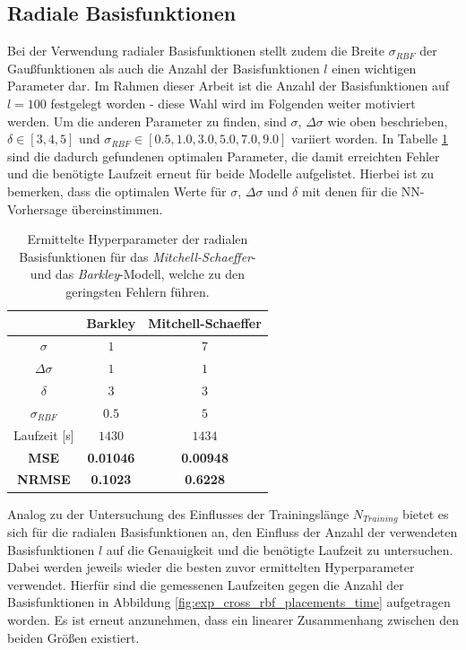 \subsection{Radiale Basisfunktionen}
Bei der Verwendung radialer Basisfunktionen stellt zudem die Breite $\sigma_{RBF}$ der Gaußfunktionen als auch die Anzahl der Basisfunktionen $l$ einen wichtigen Parameter dar. Im Rahmen dieser Arbeit ist die Anzahl der Basisfunktionen auf $l=100$ festgelegt worden - diese Wahl wird im Folgenden weiter motiviert werden. Um die anderen Parameter zu finden, sind $\sigma$, $\Delta \sigma$ wie oben beschrieben, $\delta \in [3,4,5]$ und $\sigma_{RBF} \in [0.5, 1.0, 3.0, 5.0, 7.0, 9.0]$ variiert worden. In Tabelle \ref{tab:exp_cross_rbf_results} sind die dadurch gefundenen optimalen Parameter, die damit erreichten Fehler und die benötigte Laufzeit erneut für beide Modelle aufgelistet. Hierbei ist zu bemerken, dass die optimalen Werte für $\sigma$, $\Delta \sigma$ und $\delta$ mit denen für die NN-Vorhersage übereinstimmen. 

\begin{table}[h]
	\centering

	\begin{tabular}{ccc}
		\hline 			
		\multicolumn{1}{c}{} & Barkley & Mitchell-Schaeffer \\ 
		\hline 
		\rule[-1ex]{0pt}{2.5ex} $\sigma$ & $1$ & $7$ \\ 
		\rule[-1ex]{0pt}{2.5ex} $\Delta \sigma$ & $1$ & $1$ \\ 
		\rule[-1ex]{0pt}{2.5ex} $\delta$ & $3$ & $3$ \\ 
		\rule[-1ex]{0pt}{2.5ex} $\sigma_{RBF}$ & $0.5$ & $5$ \\ 
		\rule[-1ex]{0pt}{2.5ex} Laufzeit [s] & $1430$ & $1434$ \\ 
		\rule[-1ex]{0pt}{2.5ex} \textbf{MSE} & \textbf{0.01046} & \textbf{0.00948} \\ 
		\rule[-1ex]{0pt}{2.5ex} \textbf{NRMSE} & \textbf{0.1023} & \textbf{0.6228} \\ 
		\hline 
	\end{tabular} 
	\caption{Ermittelte Hyperparameter der radialen Basisfunktionen für das \textit{Mitchell-Schaeffer}- und das \textit{Barkley}-Modell, welche zu den geringsten Fehlern führen.}
	\label{tab:exp_cross_rbf_results}
\end{table} 

Analog zu der Untersuchung des Einflusses der Trainingslänge $N_{Training}$ bietet es sich für die radialen Basisfunktionen an, den Einfluss der Anzahl der verwendeten Basisfunktionen $l$ auf die Genauigkeit und die benötigte Laufzeit zu untersuchen. Dabei werden jeweils wieder die besten zuvor ermittelten Hyperparameter verwendet. Hierfür sind die gemessenen Laufzeiten gegen die Anzahl der Basisfunktionen in Abbildung \ref{fig:exp_cross_rbf_placements_time} aufgetragen worden. Es ist erneut anzunehmen, dass ein linearer Zusammenhang zwischen den beiden Größen existiert.

